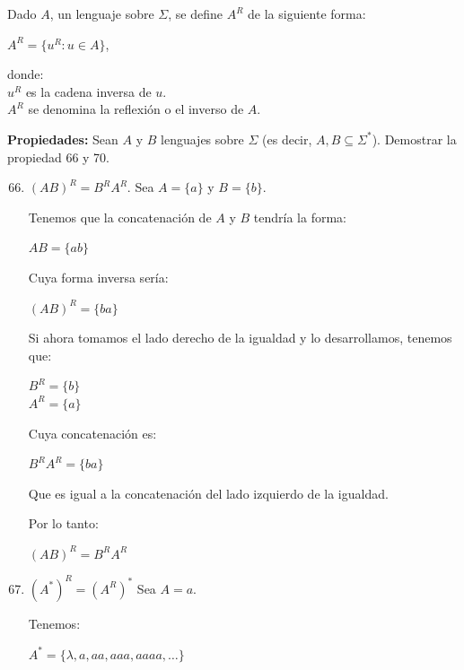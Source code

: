 Dado $A$, un lenguaje sobre $\Sigma$, se define $A^R$ de la siguiente forma:
\begin{center}
    $A^R = \{u^R : u \in A\}$,
\end{center}
donde:\\
$u^R$ es la cadena inversa de $u$.\\
$A^R$ se denomina la reflexión o el inverso de $A$.

\textbf{Propiedades:} Sean $A$ y $B$ lenguajes sobre $\Sigma$ (es decir, $A,B \subseteq \Sigma^*$). Demostrar la propiedad 66 y 70.

\begin{enumerate}
    \setcounter{enumi}{65}
    \item $(AB)^R = B^RA^R$.
        \subitem Sea $A = \{a\}$ y $B = \{b\}$.
        
        Tenemos que la concatenación de $A$ y $B$ tendría la forma:
        \begin{center}
            $AB = \{ab\}$
        \end{center}
        
        Cuya forma inversa sería:
        \begin{center}
            $(AB)^R = \{ba\}$
        \end{center}
        
        Si ahora tomamos el lado derecho de la igualdad y lo desarrollamos, tenemos que:
        \begin{center}
            $B^R = \{b\}$\\
            $A^R = \{a\}$
        \end{center}
        
        Cuya concatenación es:
        \begin{center}
            $B^RA^R = \{ba\}$
        \end{center}
        
        Que es igual a la concatenación del lado izquierdo de la igualdad.
        
        Por lo tanto:
        \begin{center}
            $\boxed{(AB)^R = B^R A^R}$
        \end{center}
    \setcounter{enumi}{69}
    \newpage
    \item $(A^*)^R = (A^R)^*$
        \subitem Sea $A = {a}$.
        
        Tenemos:
        \begin{center}
            $A^* = \{\lambda,a,aa,aaa,aaaa,\ldots\}$
        \end{center}
        

\end{enumerate}

